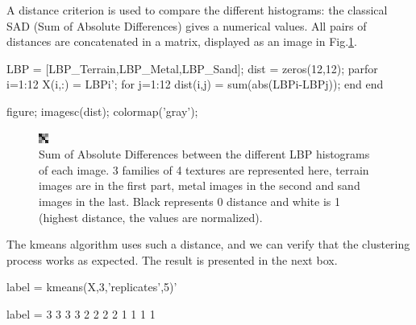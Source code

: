 A distance criterion is used to compare the different histograms: the classical SAD (Sum of Absolute Differences) gives a numerical values. All pairs of distances are concatenated in a matrix, displayed as an image in Fig.\ref{fig:lbp:matlab:dists}.

\begin{matlab}
LBP = [LBP_Terrain,LBP_Metal,LBP_Sand];
dist = zeros(12,12);
parfor i=1:12
    X(i,:) = LBP{i}';%
    for j=1:12
        dist(i,j) = sum(abs(LBP{i}-LBP{j}));
    end
end

figure;
imagesc(dist);
colormap('gray');
\end{matlab}


\begin{figure}[htbp]
 \centering
 
 \includegraphics[width=.4\linewidth]{sad_lbp.png}

 
 \caption{Sum of Absolute Differences between the different LBP histograms of each image. 3 families of 4 textures are represented here, terrain images are in the first part, metal images in the second and sand images in the last. Black represents 0  distance and white is 1 (highest distance, the values are normalized).}
 \label{fig:lbp:matlab:dists}
\end{figure}

The kmeans algorithm uses such a distance, and we can verify that the clustering process works as expected. The result is presented in the next box.
\begin{matlab}
label = kmeans(X,3,'replicates',5)'
\end{matlab}

\begin{mwindow}
label =   3   3   3   3   2   2   2   2   1   1   1   1
\end{mwindow}


